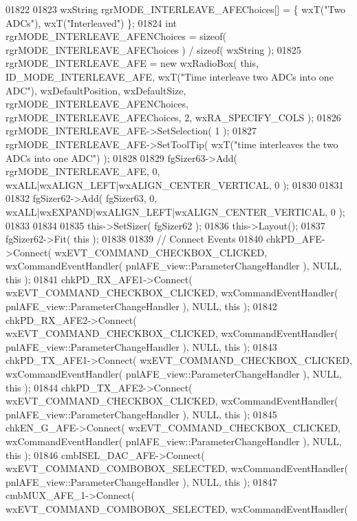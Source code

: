 \begin{DoxyCode}
01822     
01823     wxString rgrMODE\_INTERLEAVE\_AFEChoices[] = \{ wxT(\textcolor{stringliteral}{"Two ADCs"}), wxT(\textcolor{stringliteral}{"Interleaved"}) \};
01824     \textcolor{keywordtype}{int} rgrMODE\_INTERLEAVE\_AFENChoices = \textcolor{keyword}{sizeof}( rgrMODE\_INTERLEAVE\_AFEChoices ) / \textcolor{keyword}{sizeof}( wxString );
01825     rgrMODE_INTERLEAVE_AFE = \textcolor{keyword}{new} wxRadioBox( \textcolor{keyword}{this}, ID_MODE_INTERLEAVE_AFE, wxT(\textcolor{stringliteral}{"Time interleave two ADCs
       into one ADC"}), wxDefaultPosition, wxDefaultSize, rgrMODE\_INTERLEAVE\_AFENChoices, 
      rgrMODE\_INTERLEAVE\_AFEChoices, 2, wxRA\_SPECIFY\_COLS );
01826     rgrMODE_INTERLEAVE_AFE->SetSelection( 1 );
01827     rgrMODE_INTERLEAVE_AFE->SetToolTip( wxT(\textcolor{stringliteral}{"time interleaves the two ADCs into one ADC"}) );
01828     
01829     fgSizer63->Add( rgrMODE_INTERLEAVE_AFE, 0, wxALL|wxALIGN\_LEFT|wxALIGN\_CENTER\_VERTICAL, 0 );
01830     
01831     
01832     fgSizer62->Add( fgSizer63, 0, wxALL|wxEXPAND|wxALIGN\_LEFT|wxALIGN\_CENTER\_VERTICAL, 0 );
01833     
01834     
01835     this->SetSizer( fgSizer62 );
01836     this->Layout();
01837     fgSizer62->Fit( \textcolor{keyword}{this} );
01838     
01839     \textcolor{comment}{// Connect Events}
01840     chkPD_AFE->Connect( wxEVT\_COMMAND\_CHECKBOX\_CLICKED, wxCommandEventHandler( 
      pnlAFE_view::ParameterChangeHandler ), NULL, \textcolor{keyword}{this} );
01841     chkPD_RX_AFE1->Connect( wxEVT\_COMMAND\_CHECKBOX\_CLICKED, wxCommandEventHandler( 
      pnlAFE_view::ParameterChangeHandler ), NULL, \textcolor{keyword}{this} );
01842     chkPD_RX_AFE2->Connect( wxEVT\_COMMAND\_CHECKBOX\_CLICKED, wxCommandEventHandler( 
      pnlAFE_view::ParameterChangeHandler ), NULL, \textcolor{keyword}{this} );
01843     chkPD_TX_AFE1->Connect( wxEVT\_COMMAND\_CHECKBOX\_CLICKED, wxCommandEventHandler( 
      pnlAFE_view::ParameterChangeHandler ), NULL, \textcolor{keyword}{this} );
01844     chkPD_TX_AFE2->Connect( wxEVT\_COMMAND\_CHECKBOX\_CLICKED, wxCommandEventHandler( 
      pnlAFE_view::ParameterChangeHandler ), NULL, \textcolor{keyword}{this} );
01845     chkEN_G_AFE->Connect( wxEVT\_COMMAND\_CHECKBOX\_CLICKED, wxCommandEventHandler( 
      pnlAFE_view::ParameterChangeHandler ), NULL, \textcolor{keyword}{this} );
01846     cmbISEL_DAC_AFE->Connect( wxEVT\_COMMAND\_COMBOBOX\_SELECTED, wxCommandEventHandler( 
      pnlAFE_view::ParameterChangeHandler ), NULL, \textcolor{keyword}{this} );
01847     cmbMUX_AFE_1->Connect( wxEVT\_COMMAND\_COMBOBOX\_SELECTED, wxCommandEventHandler( 

\end{DoxyCode}
